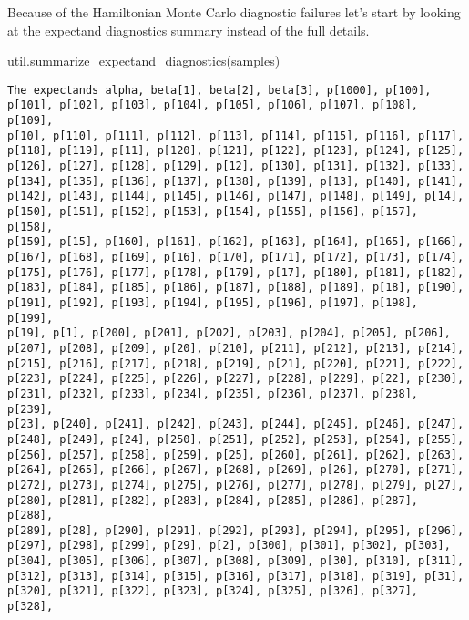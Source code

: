 \documentclass[
  letterpaper,
  DIV=11,
  numbers=noendperiod]{scrartcl}
\newenvironment{Shaded}{\begin{snugshade}}{\end{snugshade}}
\newcommand{\NormalTok}[1]{\textcolor[rgb]{0.00,0.23,0.31}{#1}}
\begin{document}
Because of the Hamiltonian Monte Carlo diagnostic failures let's start
by looking at the expectand diagnostics summary instead of the full
details.

\begin{Shaded}
\begin{Highlighting}[]
\NormalTok{util.summarize\_expectand\_diagnostics(samples)}
\end{Highlighting}
\end{Shaded}

\begin{verbatim}
The expectands alpha, beta[1], beta[2], beta[3], p[1000], p[100],
p[101], p[102], p[103], p[104], p[105], p[106], p[107], p[108], p[109],
p[10], p[110], p[111], p[112], p[113], p[114], p[115], p[116], p[117],
p[118], p[119], p[11], p[120], p[121], p[122], p[123], p[124], p[125],
p[126], p[127], p[128], p[129], p[12], p[130], p[131], p[132], p[133],
p[134], p[135], p[136], p[137], p[138], p[139], p[13], p[140], p[141],
p[142], p[143], p[144], p[145], p[146], p[147], p[148], p[149], p[14],
p[150], p[151], p[152], p[153], p[154], p[155], p[156], p[157], p[158],
p[159], p[15], p[160], p[161], p[162], p[163], p[164], p[165], p[166],
p[167], p[168], p[169], p[16], p[170], p[171], p[172], p[173], p[174],
p[175], p[176], p[177], p[178], p[179], p[17], p[180], p[181], p[182],
p[183], p[184], p[185], p[186], p[187], p[188], p[189], p[18], p[190],
p[191], p[192], p[193], p[194], p[195], p[196], p[197], p[198], p[199],
p[19], p[1], p[200], p[201], p[202], p[203], p[204], p[205], p[206],
p[207], p[208], p[209], p[20], p[210], p[211], p[212], p[213], p[214],
p[215], p[216], p[217], p[218], p[219], p[21], p[220], p[221], p[222],
p[223], p[224], p[225], p[226], p[227], p[228], p[229], p[22], p[230],
p[231], p[232], p[233], p[234], p[235], p[236], p[237], p[238], p[239],
p[23], p[240], p[241], p[242], p[243], p[244], p[245], p[246], p[247],
p[248], p[249], p[24], p[250], p[251], p[252], p[253], p[254], p[255],
p[256], p[257], p[258], p[259], p[25], p[260], p[261], p[262], p[263],
p[264], p[265], p[266], p[267], p[268], p[269], p[26], p[270], p[271],
p[272], p[273], p[274], p[275], p[276], p[277], p[278], p[279], p[27],
p[280], p[281], p[282], p[283], p[284], p[285], p[286], p[287], p[288],
p[289], p[28], p[290], p[291], p[292], p[293], p[294], p[295], p[296],
p[297], p[298], p[299], p[29], p[2], p[300], p[301], p[302], p[303],
p[304], p[305], p[306], p[307], p[308], p[309], p[30], p[310], p[311],
p[312], p[313], p[314], p[315], p[316], p[317], p[318], p[319], p[31],
p[320], p[321], p[322], p[323], p[324], p[325], p[326], p[327], p[328],

\end{verbatim}
\end{document}
